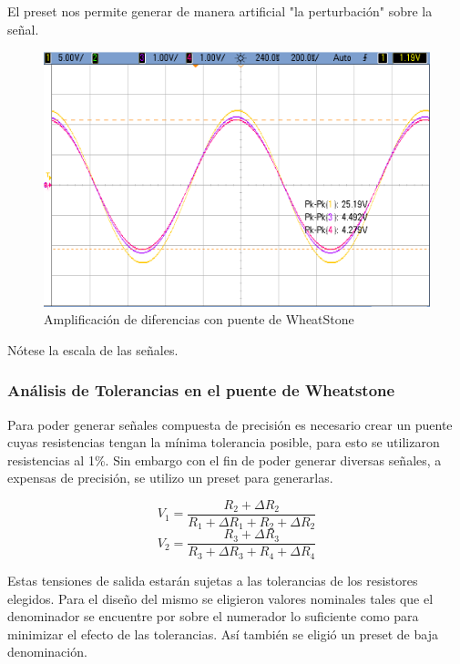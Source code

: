 El preset nos permite generar de manera artificial "la perturbación" sobre la señal.

\begin{figure}[H]
	\centering
	\includegraphics[height=0.3\textheight]{./ImagenesDeOsciloscopio/WheatStone1tierra1c1R.png}
	\caption{Amplificación de diferencias con puente de WheatStone}
\end{figure}
Nótese la escala de las señales.
\subsubsection{Análisis de Tolerancias en el puente de Wheatstone}
Para poder generar señales compuesta de precisión es necesario crear un puente cuyas resistencias tengan la mínima tolerancia posible, para esto se utilizaron resistencias al 1\%. Sin embargo con el fin de poder generar diversas señales, a expensas de precisión, se utilizo un preset para generarlas.

\begin{equation}
V_1 = \frac{R_2+\Delta R_2}{R_1+\Delta R_1+R_2+\Delta R_2}
\end{equation}
\begin{equation}
V_2 = \frac{R_3+\Delta R_3}
{R_3+\Delta R_3+R_4+\Delta R_4}
\end{equation}

Estas tensiones de salida estarán sujetas a las tolerancias de los resistores elegidos.
Para el diseño del mismo se eligieron valores nominales tales que el denominador se encuentre por sobre el numerador lo suficiente como para minimizar el efecto de las tolerancias. Así también se eligió un preset de baja denominación.


